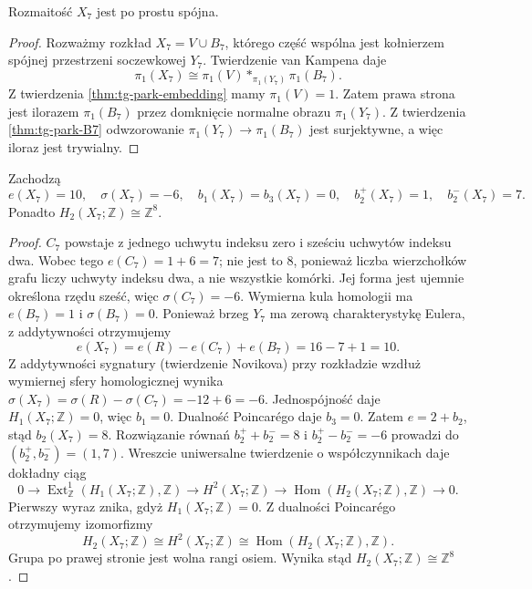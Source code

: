 \begin{twierdzenie}
\label{thm:tg-park-pi1}
Rozmaitość $X_7$ jest po prostu spójna.
\end{twierdzenie}

\begin{proof}
Rozważmy rozkład $X_7=V\cup B_7$,
którego część wspólna jest kołnierzem spójnej
przestrzeni soczewkowej $Y_7$.
Twierdzenie van Kampena daje
\[
\pi_1(X_7)\cong
\pi_1(V)*_{\pi_1(Y_7)}\pi_1(B_7).
\]
Z twierdzenia \ref{thm:tg-park-embedding} mamy
$\pi_1(V)=1$. Zatem prawa strona jest ilorazem
$\pi_1(B_7)$ przez domknięcie normalne obrazu
$\pi_1(Y_7)$. Z twierdzenia \ref{thm:tg-park-B7}
odwzorowanie $\pi_1(Y_7)\to\pi_1(B_7)$ jest
surjektywne, a więc iloraz jest trywialny.
\end{proof}

\begin{twierdzenie}
\label{thm:tg-park-numbers}
Zachodzą
\[
e(X_7)=10,\quad \sigma(X_7)=-6,\quad
b_1(X_7)=b_3(X_7)=0,\quad
b_2^+(X_7)=1,\quad b_2^-(X_7)=7.
\]
Ponadto $H_2(X_7;\mathbb Z)\cong\mathbb Z^8$.
\end{twierdzenie}

\begin{proof}
$C_7$ powstaje z jednego uchwytu indeksu zero
i sześciu uchwytów indeksu dwa. Wobec tego
$e(C_7)=1+6=7$; nie jest to $8$, ponieważ
liczba wierzchołków grafu liczy uchwyty indeksu
dwa, a nie wszystkie komórki. Jej forma jest
ujemnie określona rzędu sześć, więc
$\sigma(C_7)=-6$.
Wymierna kula homologii ma $e(B_7)=1$ i
$\sigma(B_7)=0$.
Ponieważ brzeg $Y_7$ ma zerową charakterystykę
Eulera, z addytywności otrzymujemy
\[
e(X_7)=e(R)-e(C_7)+e(B_7)=16-7+1=10.
\]
Z addytywności sygnatury (twierdzenie Novikova)
przy rozkładzie wzdłuż wymiernej sfery homologicznej
wynika $\sigma(X_7)=\sigma(R)-\sigma(C_7)=-12+6=-6$.
Jednospójność daje $H_1(X_7;\mathbb Z)=0$, więc
$b_1=0$. Dualność Poincarégo daje $b_3=0$.
Zatem $e=2+b_2$, stąd $b_2(X_7)=8$.
Rozwiązanie równań $b_2^++b_2^-=8$ i
$b_2^+-b_2^-=-6$ prowadzi do $(b_2^+,b_2^-)=(1,7)$.
Wreszcie uniwersalne twierdzenie o współczynnikach
daje dokładny ciąg
\[
0\longrightarrow
\operatorname{Ext}^1_{\mathbb Z}(H_1(X_7;\mathbb Z),\mathbb Z)
\longrightarrow H^2(X_7;\mathbb Z)
\longrightarrow
\operatorname{Hom}(H_2(X_7;\mathbb Z),\mathbb Z)
\longrightarrow0.
\]
Pierwszy wyraz znika, gdyż $H_1(X_7;\mathbb Z)=0$.
Z dualności Poincarégo otrzymujemy izomorfizmy
\[
H_2(X_7;\mathbb Z)\cong H^2(X_7;\mathbb Z)
\cong\operatorname{Hom}(H_2(X_7;\mathbb Z),\mathbb Z).
\]
Grupa po prawej stronie jest wolna rangi osiem.
Wynika stąd $H_2(X_7;\mathbb Z)\cong\mathbb Z^8$.
\end{proof}

